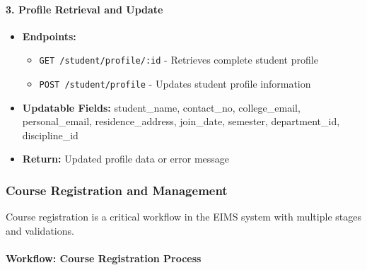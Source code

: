 \documentclass[12pt]{article}
\begin{document}
\paragraph{3. Profile Retrieval and Update}
\begin{itemize}
    \item \textbf{Endpoints:}
        \begin{itemize}
            \item \texttt{GET /student/profile/:id} - Retrieves complete student profile
            \item \texttt{POST /student/profile} - Updates student profile information
        \end{itemize}
    \item \textbf{Updatable Fields:} student\_name, contact\_no, college\_email, personal\_email, residence\_address, join\_date, semester, department\_id, discipline\_id
    \item \textbf{Return:} Updated profile data or error message
\end{itemize}

\subsubsection{Course Registration and Management}

Course registration is a critical workflow in the EIMS system with multiple stages and validations.

\paragraph{Workflow: Course Registration Process}
\end{document}
